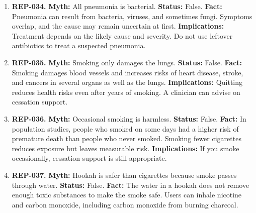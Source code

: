 \documentclass[11pt,oneside]{book}
\begin{document}
\begin{enumerate}[leftmargin=0pt,labelwidth=0pt,labelsep=0pt,itemindent=0pt]
\textbf{Status:} False.\newline
\textbf{Fact:} Pneumonia is an infection of the lungs that can occur in any season. Seasonal changes in circulating respiratory viruses can affect how often it occurs. \cite{ref261}\newline
\textbf{Implications:} Seek assessment for concerning cough, fever, or breathlessness regardless of the weather. Severe breathing difficulty warrants emergency care.
\item[] \textbf{REP-034.} \textbf{Myth:} All pneumonia is bacterial.\newline
\textbf{Status:} False.\newline
\textbf{Fact:} Pneumonia can result from bacteria, viruses, and sometimes fungi. Symptoms overlap, and the cause may remain uncertain at first. \cite{ref261,ref262}\newline
\textbf{Implications:} Treatment depends on the likely cause and severity. Do not use leftover antibiotics to treat a suspected pneumonia.
\item[] \textbf{REP-035.} \textbf{Myth:} Smoking only damages the lungs.\newline
\textbf{Status:} False.\newline
\textbf{Fact:} Smoking damages blood vessels and increases risks of heart disease, stroke, and cancers in several organs as well as the lungs. \cite{ref335}\newline
\textbf{Implications:} Quitting reduces health risks even after years of smoking. A clinician can advise on cessation support.
\item[] \textbf{REP-036.} \textbf{Myth:} Occasional smoking is harmless.\newline
\textbf{Status:} False.\newline
\textbf{Fact:} In population studies, people who smoked on some days had a higher risk of premature death than people who never smoked. Smoking fewer cigarettes reduces exposure but leaves measurable risk. \cite{ref336}\newline
\textbf{Implications:} If you smoke occasionally, cessation support is still appropriate.
\item[] \textbf{REP-037.} \textbf{Myth:} Hookah is safer than cigarettes because smoke passes through water.\newline
\textbf{Status:} False.\newline
\textbf{Fact:} The water in a hookah does not remove enough toxic substances to make the smoke safe. Users can inhale nicotine and carbon monoxide, including carbon monoxide from burning charcoal. \cite{ref337}\newline

\end{enumerate}
\end{document}
